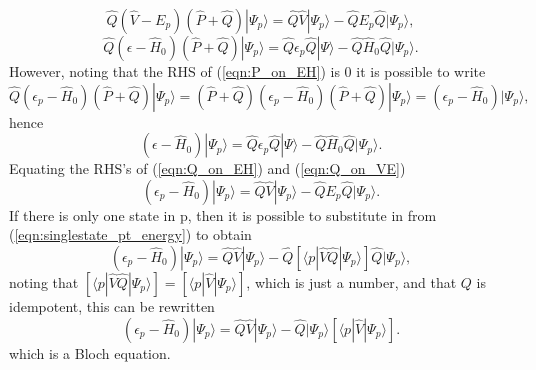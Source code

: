 \documentclass[12pt]{article}
\begin{document}
\begin{equation}
\hat{Q}(\hat{V}-E_{p})(\hat{P}+\hat{Q})|\Psi_{p} \rangle = \hat{Q}\hat{V}|\Psi_{p} \rangle - \hat{Q}E_{p}\hat{Q}|\Psi_{p}\rangle ,
\label{eqn:Q_on_VE}
\end{equation}
\begin{equation}
\hat{Q}(\epsilon - \hat{H}_{0})(\hat{P}+\hat{Q})| \Psi_{p} \rangle  = \hat{Q}\epsilon_{p}\hat{Q}|\Psi\rangle- \hat{Q}\hat{H}_{0}\hat{Q}|\Psi_{p}\rangle.
\end{equation}
However, noting that the RHS of (\ref{eqn:P_on_EH}) is $0$ it is possible to write
\begin{equation*}
\hat{Q}(\epsilon_{p} - \hat{H}_{0})(\hat{P}+\hat{Q})| \Psi_{p} \rangle =
(\hat{P} + \hat{Q})(\epsilon_{p} - \hat{H}_{0})(\hat{P}+\hat{Q})| \Psi_{p} \rangle =
(\epsilon_{p} - \hat{H}_{0})| \Psi_{p} \rangle ,
\end{equation*}
hence
\begin{equation}
(\epsilon - \hat{H}_{0})| \Psi_{p} \rangle  = \hat{Q}\epsilon_{p}\hat{Q}|\Psi\rangle- \hat{Q}\hat{H}_{0}\hat{Q}|\Psi_{p}\rangle.
\label{eqn:Q_on_EH} 
\end{equation}
Equating the RHS's of (\ref{eqn:Q_on_EH}) and (\ref{eqn:Q_on_VE})
 \begin{equation*}
(\epsilon_{p} - \hat{H}_{0})|\Psi_{p}\rangle
= \hat{Q}\hat{V}|\Psi_{p} \rangle - \hat{Q}E_{p}\hat{Q}|\Psi_{p}\rangle .
\end{equation*}
If there is only one state in $\mathrm{p}$, then it is possible to substitute in from  (\ref{eqn:singlestate_pt_energy}) to obtain
\begin{equation*}
( \epsilon_{p}- \hat{H}_{0} )|\Psi_{p}\rangle = 
\hat{Q}\hat{V}|\Psi_{p} \rangle - \hat{Q}[\langle p | \hat{V}\hat{Q}|\Psi_{p} \rangle] \hat{Q}|\Psi_{p}\rangle, 
\end{equation*}
noting that  $[\langle p | \hat{V}\hat{Q}|\Psi_{p} \rangle] = [\langle p | \hat{V} |\Psi_{p} \rangle]$, which
is just a number, and that $Q$ is idempotent, this can be rewritten
\begin{equation}
( \epsilon_{p}- \hat{H}_{0} )|\Psi_{p}\rangle = 
\hat{Q}\hat{V}|\Psi_{p} \rangle -  \hat{Q}|\Psi_{p}\rangle[\langle p | \hat{V} |\Psi_{p} \rangle]. 
\label{eqn:Q_on_both_sides_singlestate}
\end{equation}
which is a Bloch equation. \\
\end{document}
